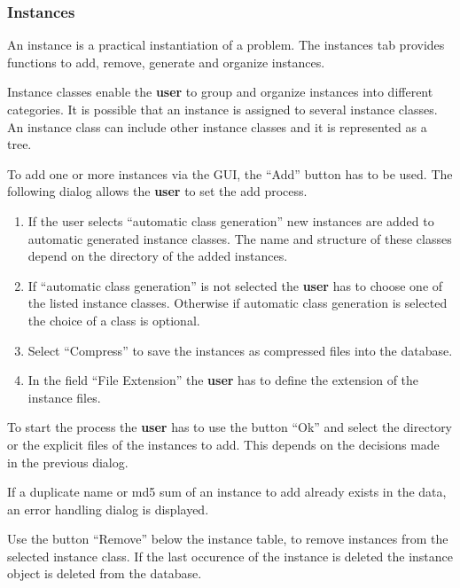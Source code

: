\subsubsection{Instances}
 An instance is a practical instantiation of a problem. The instances tab provides functions to add, remove, generate and organize instances.

 Instance classes enable the \textbf{user} to group and organize instances into different categories. It is possible that an instance is assigned to several instance classes. An instance class can include other instance classes and it is represented as a tree.

 To add one or more instances via the GUI, the ``Add'' button  has to be used. The following dialog allows the \textbf{user} to set the add process.
\begin{enumerate}
	\item If the user selects ``automatic class generation'' new instances are added to automatic generated instance classes. The name and structure of these classes depend on the directory of the added instances.
	
	\item If ``automatic class generation'' is not selected the \textbf{user} has to choose one of the listed instance classes. Otherwise if automatic class generation is selected the choice of a class is optional.
	
	\item Select ``Compress'' to save the instances as compressed files into the database.
	
	\item In the field ``File Extension'' the \textbf{user} has to define the extension of the instance files.
\end{enumerate}

To start the process the \textbf{user} has to use the button ``Ok'' and select the directory  or the explicit files of the instances to add. This depends on the decisions made in the previous dialog.

\attention If a duplicate name or md5 sum of an instance to add already exists in the \edacc data, an error handling dialog is displayed. 
 
 Use the button ``Remove'' below the instance table, to remove instances from the selected instance class. If the last occurence of the instance is deleted the instance object is deleted from the database.

